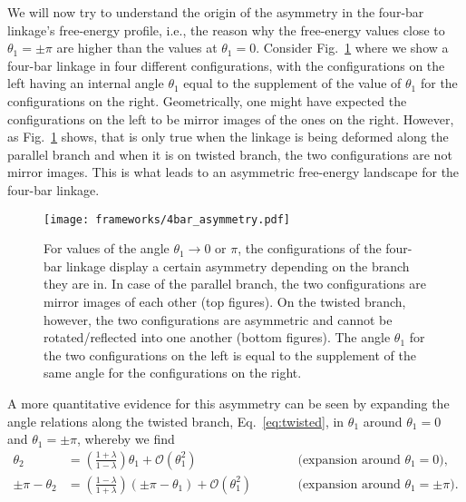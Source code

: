 We will now try to understand the origin of the asymmetry in the four-bar linkage's free-energy profile, i.e., the reason why the free-energy values close to $\theta_{1} = \pm \pi$ are higher than the values at $\theta_{1} = 0$.
Consider Fig.~\ref{fig:4bar_asymmetry} where we show a four-bar linkage in four different configurations, with the configurations on the left having an internal angle $\theta_{1}$ equal to the supplement of the value of $\theta_{1}$ for the configurations on the right.
Geometrically, one might have expected the configurations on the left to be mirror images of the ones on the right.
However, as Fig.~\ref{fig:4bar_asymmetry} shows, that is only true when the linkage is being deformed along the parallel branch and when it is on twisted branch, the two configurations are not mirror images.
This is what leads to an asymmetric free-energy landscape for the four-bar linkage.
%
\begin{figure}
  \begin{center}
    \texttt{[image: frameworks/4bar\_asymmetry.pdf]}
  \end{center}
  \caption{%
    For values of the angle $\theta_{1} \to 0 \text{ or } \pi$, the configurations of the four-bar linkage display a certain asymmetry depending on the branch they are in.
    In case of the parallel branch, the two configurations are mirror images of each other (top figures).
    On the twisted branch, however, the two configurations are asymmetric and cannot be rotated/reflected into one another (bottom figures).
    The angle $\theta_{1}$ for the two configurations on the left is equal to the supplement of the same angle for the configurations on the right.
  }
  \label{fig:4bar_asymmetry}
\end{figure}
%
A more quantitative evidence for this asymmetry can be seen by expanding the angle relations along the twisted branch, Eq.~\eqref{eq:twisted}, in $\theta_{1}$ around $\theta_{1} = 0$ and $\theta_{1} = \pm\pi$, whereby we find
%
\begin{equation}
  \begin{alignedat}{2}
    \theta_{2} &= \left(\frac{1+\lambda}{1-\lambda}\right)\theta_{1} + \mathcal{O}(\theta_{1}^{2}) && \qquad\text{(expansion around $\theta_{1} = 0)$},\\
    \pm\pi - \theta_{2} &= \left(\frac{1-\lambda}{1+\lambda}\right)\left(\pm\pi - \theta_{1}\right) + \mathcal{O}(\theta_{1}^{2}) && \qquad\text{(expansion around $\theta_{1} = \pm \pi$)}.
  \end{alignedat}
\end{equation}

